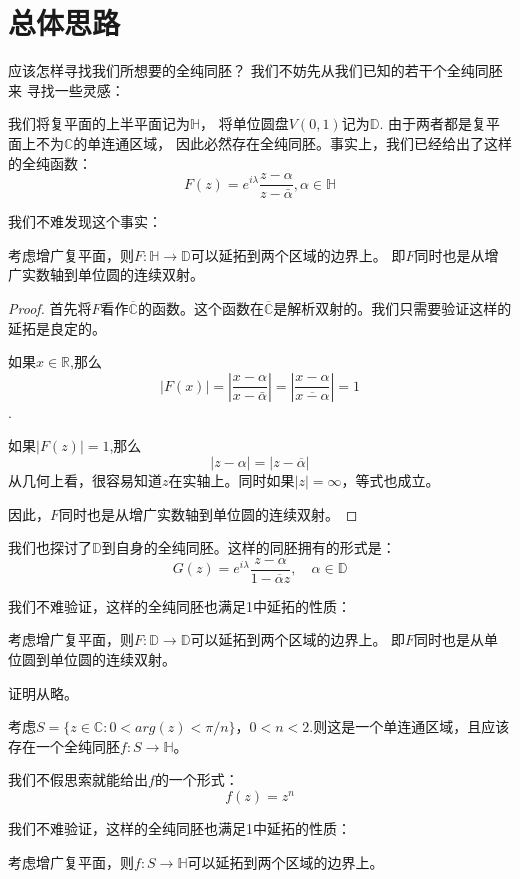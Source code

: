 \documentclass[UTF8]{ctexart}[a4paper,10pt]
\def\C{\mathbb{C}}
\def\D{\mathbb{D}}
\def\H{\mathbb{H}}
\begin{document}
    \section{总体思路}
    应该怎样寻找我们所想要的全纯同胚？
    我们不妨先从我们已知的若干个全纯同胚来
    寻找一些灵感：
    \begin{example}
    我们将复平面的上半平面记为$\mathbb{H}$，
    将单位圆盘$V(0,1)$记为$\mathbb{D}$.
    由于两者都是复平面上不为$\mathbb{C}$的单连通区域，
    因此必然存在全纯同胚。事实上，我们已经给出了这样的全纯函数：
    $$
    F(z)=e^{i\lambda}\frac{z-\alpha}{z-\bar{\alpha}},\alpha \in \mathbb{H}
    $$
    
    我们不难发现这个事实：
    \begin{pro}
        考虑增广复平面，则$F: \mathbb{H}\rightarrow \mathbb{D}$可以延拓到两个区域的边界上。
        即$F$同时也是从增广实数轴到单位圆的连续双射。
    \end{pro}
    \begin{proof}
        首先将$F$看作$\overline{\mathbb{C}}$的函数。这个函数在$\overline{\mathbb{C}}$是解析双射的。我们只需要验证这样的延拓是良定的。
        
        如果$x\in \mathbb{R} $,那么
        $$
        |F(x)|=|\frac{x-\alpha}{x-\bar{\alpha}}|=|\frac{x-\alpha}{\overline{x-\alpha}}|=1
        $$.

        如果$|F(z)|=1$,那么
        $$
        |z-\alpha|=|z-\overline{\alpha}|
        $$
        从几何上看，很容易知道$z$在实轴上。同时如果$|z|=\infty$，等式也成立。

        因此，$F$同时也是从增广实数轴到单位圆的连续双射。
    \end{proof}
    \end{example}
    \begin{example}
    我们也探讨了$\mathbb{D}$到自身的全纯同胚。这样的同胚拥有的形式是：
        $$
        G(z)=e^{i\lambda}\frac{z-\alpha}{1-\overline{\alpha}z}, \quad \alpha \in \mathbb{D} 
        $$
    
        我们不难验证，这样的全纯同胚也满足1中延拓的性质：
        \begin{pro}
            考虑增广复平面，则$F: \D \rightarrow \mathbb{D}$可以延拓到两个区域的边界上。
            即$F$同时也是从单位圆到单位圆的连续双射。
        \end{pro}
        证明从略。 
    \end{example}
    \begin{example}
    考虑$S=\{z\in \C :0 < arg(z) < \pi/n \}，0<n<2$.则这是一个单连通区域，且应该存在一个全纯同胚$f:S\rightarrow \H$。
      
      我们不假思索就能给出$f$的一个形式：
      $$
      f(z)=z^n
      $$
    
    我们不难验证，这样的全纯同胚也满足1中延拓的性质：
    \begin{pro}
        考虑增广复平面，则$f: S \rightarrow \mathbb{H}$可以延拓到两个区域的边界上。
    \end{pro}

    \end{example}
\end{document}
